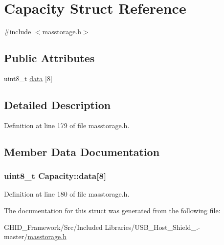 \hypertarget{struct_capacity}{\section{\-Capacity \-Struct \-Reference}
\label{struct_capacity}
}


{\ttfamily \#include $<$masstorage.\-h$>$}

\subsection*{\-Public \-Attributes}
\begin{DoxyCompactItemize}
\item 
uint8\-\_\-t \hyperlink{struct_capacity_ae6dd521cd2ece3d6fa6fe58180fb9e8a}{data} \mbox{[}8\mbox{]}
\end{DoxyCompactItemize}


\subsection{\-Detailed \-Description}


\-Definition at line 179 of file masstorage.\-h.



\subsection{\-Member \-Data \-Documentation}
\hypertarget{struct_capacity_ae6dd521cd2ece3d6fa6fe58180fb9e8a}{
\subsubsection[{data}]{\setlength{\rightskip}{0pt plus 5cm}uint8\-\_\-t {\bf \-Capacity\-::data}\mbox{[}8\mbox{]}}}\label{struct_capacity_ae6dd521cd2ece3d6fa6fe58180fb9e8a}


\-Definition at line 180 of file masstorage.\-h.



\-The documentation for this struct was generated from the following file\-:\begin{DoxyCompactItemize}
\item 
\-G\-H\-I\-D\-\_\-\-Framework/\-Src/\-Included Libraries/\-U\-S\-B\-\_\-\-Host\-\_\-\-Shield\-\_.-\/master/\hyperlink{masstorage_8h}{masstorage.\-h}\end{DoxyCompactItemize}
